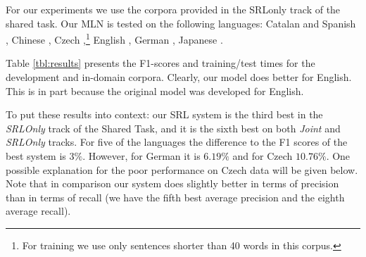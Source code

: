 For our experiments we use the corpora provided in the SRLonly track of the shared task. Our MLN is tested on the following languages: Catalan and Spanish 
\citep{catalan-and-spanish-data} , Chinese \citep{chinese-data}, Czech 
\citep{czech-data},\footnote{For training we use only sentences shorter than 40 
words in this corpus.} English \citep{english-data}, German 
\citep{german-data}, Japanese \citep{japanese-data}. 

Table \ref{tbl:results} presents the F1-scores and training/test times for the development and
in-domain corpora. Clearly, our model does better for English. This is in part because the original model was developed for English. 

To put these results into context: our SRL system is the third best in the \emph{SRLOnly} 
track of the Shared Task, and it is the sixth best on both \emph{Joint} 
and \emph{SRLOnly} tracks. For five of the languages the difference to the F1 scores 
of the best system is $3\%$.  However, for 
German it is $6.19\%$ and for Czech $10.76\%$.  One possible explanation for the poor performance on Czech data will be given below. Note that in comparison our system does slightly better in terms of precision than in terms of recall (we have the fifth best average precision and the eighth average 
recall).


